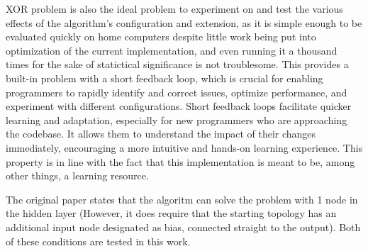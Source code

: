 \documentclass{article}
\begin{document}
        \par XOR problem is also the ideal problem to experiment on and test the various effects of the algorithm's configuration and extension,
        as it is simple enough to be evaluated quickly on home computers despite little work being put into optimization of the
        current implementation,
        and even running it a thousand times for the sake of statictical significance is not troublesome.
        This provides a built-in problem with a short feedback loop, which is crucial for 
        enabling programmers to rapidly identify and correct issues, optimize performance, and experiment with different configurations.
        Short feedback loops facilitate quicker learning and adaptation, especially for new programmers who are approaching the codebase.
        It allows them to understand the impact of their changes immediately, encouraging a more intuitive and hands-on learning experience.
        This property is in line with the fact that this implementation is meant to be, among other things, a learning resource.

        The original paper \cite{originalNeat}
        states that the algoritm can solve the problem with 1 node in the hidden layer (However,
        it does require that the starting topology has an additional input node designated
        as bias, connected straight to the output). Both of these conditions are tested in this work.
\end{document}
